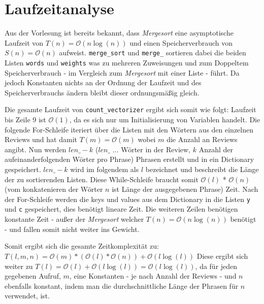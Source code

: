 \documentclass[ngerman]{scrartcl}
\newcommand{\code}{\texttt}
\begin{document}
\section{Laufzeitanalyse}
\label{sec:runtime}
Aus der Vorlesung ist bereits bekannt, dass \emph{Mergesort} eine asymptotische Laufzeit von $T(n) = \mathcal{O}(n\log(n))$ und einen Speicherverbrauch von $S(n) = \mathcal{O}(n)$ aufweist. 
\code{merge\_sort} und \code{merge\_} sortieren dabei die beiden Listen \code{words} und \code{weights} was zu mehreren Zuweisungen und zum Doppeltem Speicherverbrauch - im Vergleich zum \emph{Mergesort} mit einer Liste - führt. Da jedoch Konstanten nichts an der Ordnung der Laufzeit und des Speicherverbrauchs ändern bleibt dieser ordnungsmäßig gleich. 

Die gesamte Laufzeit von \code{count\_vectorizer} ergibt sich somit wie folgt: Laufzeit bis Zeile 9 ist $\mathcal{O}(1)$, da es sich nur um Initialisierung von Variablen handelt. Die folgende For-Schleife iteriert über die Listen mit den Wörtern aus den einzelnen Reviews und hat damit $T(m) = \mathcal{O}(m)$ wobei $m$ die Anzahl an Reviews angibt. Nun werden $len\_ - k$ ($len\_$ ... Wörter in der Review, $k$ Anzahl der aufeinanderfolgenden Wörter pro Phrase) Phrasen erstellt und in ein Dictionary gespeichert. $len\_-k$ wird im folgendem als $l$ bezeichnet und beschreibt die Länge der zu sortierenden Listen.
Diese While-Schleife braucht somit $\mathcal{O}(l)$ * $\mathcal{O}(n)$ (vom konkatenieren der Wörter $n$ ist Länge der ausgegebenen Phrase) Zeit. 
Nach der For-Schleife werden die keys und values aus dem Dictionary in die Listen \code{y} und \code{c} gespeichert, dies benötigt lineare Zeit. Die weiteren Zeilen benötigen konstante Zeit - außer der \emph{Mergesort} welcher $T(n) = \mathcal{O}(n\log(n))$ benötigt - und fallen somit nicht weiter ins Gewicht. 

Somit ergibt sich die gesamte Zeitkomplexität zu: $T(l,m,n) = \mathcal{O}(m) * (\mathcal{O}(l) * \mathcal{O}(n)) + \mathcal{O}(l\log(l))$
Diese ergibt sich weiter zu $T(l) = \mathcal{O}(l) + \mathcal{O}(l\log(l)) = \mathcal{O}(l\log(l))$, da für jeden gegebenen Aufruf, $m$, eine Konstanten - je nach Anzahl der Reviews - und $n$ ebenfalls konstant, indem man die durchschnittliche Länge der Phrasen für $n$ verwendet, ist.
\end{document}
